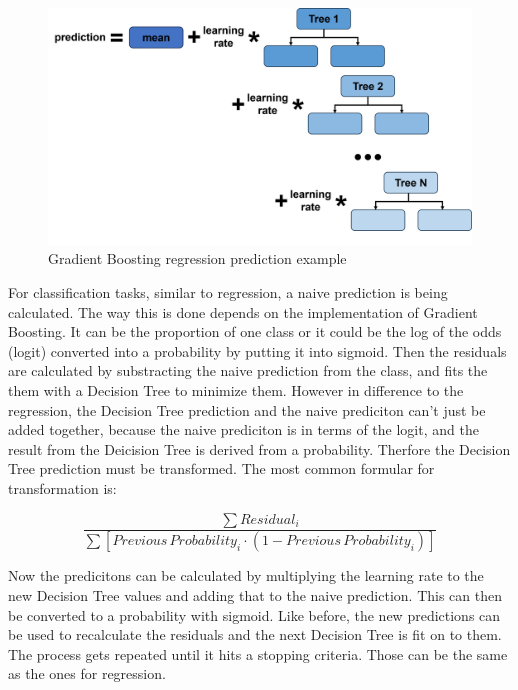 \begin{figure}[htbp]
    \centering
    \includegraphics[width=.8\textwidth]{figures/gradient_boosting_prediction}
    \caption{Gradient Boosting regression prediction example}
\end{figure}

For classification tasks, similar to regression, a naive prediction is being calculated.
The way this is done depends on the implementation of Gradient Boosting. It can be the proportion of one
class or it could be the log of the odds (logit) converted into a probability by putting it into sigmoid.
Then the residuals are calculated by substracting the naive prediction from the class, and fits the them with
a Decision Tree to minimize them.
However in difference to the regression, the Decision Tree prediction and the naive prediciton can't just be added
together, because the naive prediciton is in terms of the logit, and the result from the Deicision Tree is derived
from a probability. Therfore the Decision Tree prediction must be transformed. The most common formular for
transformation is:

$$\frac{\sum Residual_i}{\sum [Previous \, Probability_i \cdot (1 - Previous \, Probability_i)]}$$

Now the predicitons can be calculated by multiplying the learning rate to the new Decision Tree values and
adding that to the naive prediction. This can then be converted to a probability with sigmoid.
Like before, the new predictions can be used to recalculate the residuals and the next Decision Tree is fit on to them.
The process gets repeated until it hits a stopping criteria. Those can be the same as the ones for regression.

